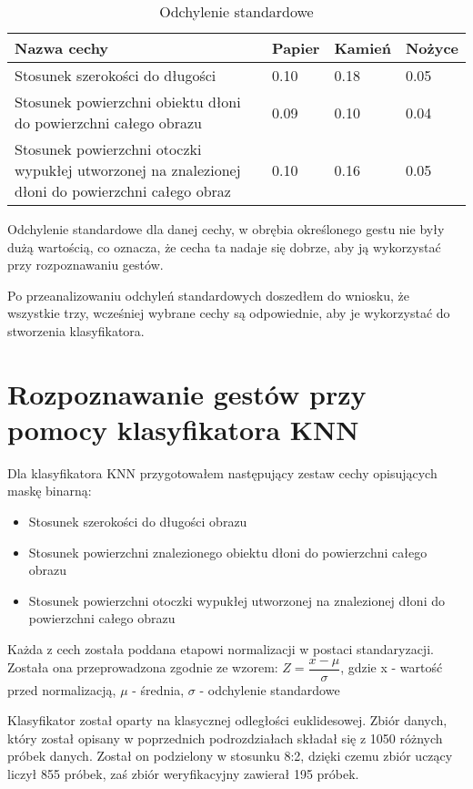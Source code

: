 \documentclass[a4paper,12pt,twoside,openany]{report}
\begin{document}
\begin{table}[H]
	\centering
	\begin{tabularx}{\textwidth}{|X|l|l|l|}
		\hline
		\textbf{Nazwa cechy} & \textbf{Papier} & \textbf{Kamień} & \textbf{Nożyce} \\ 
		
		\hline
		Stosunek szerokości do długości & 0.10 & 0.18 & 0.05 \\ 
		
		\hline
		Stosunek powierzchni obiektu dłoni do powierzchni całego obrazu & 0.09 & 0.10 & 0.04 \\ 
		
		\hline
		Stosunek powierzchni otoczki wypukłej utworzonej na znalezionej dłoni do powierzchni całego obraz & 0.10 & 0.16 & 0.05 \\ 
		\hline
	\end{tabularx}
	
	\caption{Odchylenie standardowe}
\end{table}
Odchylenie standardowe dla danej cechy, w obrębia określonego gestu nie były dużą wartością, co oznacza, że cecha ta nadaje się dobrze, aby ją wykorzystać przy rozpoznawaniu gestów.

Po przeanalizowaniu odchyleń standardowych doszedłem do wniosku, że wszystkie trzy, wcześniej wybrane cechy są odpowiednie, aby je wykorzystać do stworzenia klasyfikatora.  

\section{Rozpoznawanie gestów przy pomocy klasyfikatora KNN}
Dla klasyfikatora KNN przygotowałem następujący zestaw cechy opisujących maskę binarną: 
\begin{itemize}
	\item Stosunek szerokości do długości obrazu
	\item Stosunek powierzchni znalezionego obiektu dłoni do powierzchni całego obrazu
	\item Stosunek powierzchni otoczki wypukłej utworzonej na znalezionej dłoni do powierzchni całego obrazu
\end{itemize}

Każda z cech została poddana etapowi normalizacji w postaci standaryzacji. Została ona przeprowadzona zgodnie ze wzorem: $ Z = \dfrac{x - \mu}{\sigma} $, gdzie x - wartość przed normalizacją, $\mu$ - średnia, $\sigma$ - odchylenie standardowe

Klasyfikator został oparty na klasycznej odległości euklidesowej. Zbiór danych, który został opisany w poprzednich podrozdziałach składał się z 1050 różnych próbek danych. Został on podzielony w stosunku 8:2, dzięki czemu zbiór uczący liczył 855 próbek, zaś zbiór weryfikacyjny zawierał 195 próbek. 
\end{document}
